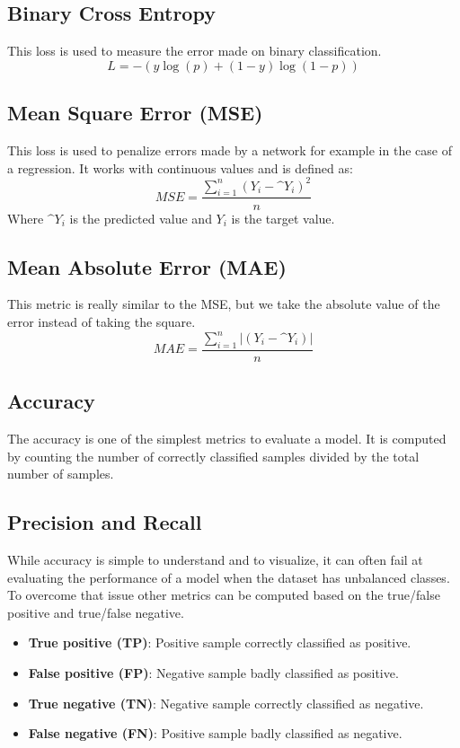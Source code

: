 \subsection{Binary Cross Entropy}
\label{sec:binary_cross_entropy}
This loss is used to measure the error made on binary classification.
$$ L = -(y\log(p) + (1-y)\log(1-p))$$

\subsection{Mean Square Error (MSE)}
\label{sec:mean_square_error}
This loss is used to penalize errors made by a network for example in the case of a regression. It works with continuous values and is defined as:
$$ MSE = \frac{\sum_{i=1}^{n} (Y_i - \^{Y}_i)^2}{n}$$
Where $\^{Y}_i$ is the predicted value and $Y_i$ is the target value.
\subsection{Mean Absolute Error (MAE)}
This metric is really similar to the MSE, but we take the absolute value of the error instead of taking the square.
$$ MAE = \frac{\sum_{i=1}^{n} |(Y_i - \^{Y}_i)|}{n}$$
\subsection{Accuracy}
The accuracy is one of the simplest metrics to evaluate a model. It is computed by counting the number of correctly classified samples divided by the total number of samples.


\subsection{Precision and Recall}
While accuracy is simple to understand and to visualize, it can often fail at evaluating the performance of a model when the dataset has unbalanced classes. To overcome that issue other metrics can be computed based on the true/false positive and true/false negative.

\begin{itemize}
    \item \textbf{True positive (TP)}: Positive sample correctly classified as positive. 
    \item \textbf{False positive (FP)}: Negative sample badly classified as positive. 
    \item \textbf{True negative (TN)}: Negative sample correctly classified as negative. 
    \item \textbf{False negative (FN)}: Positive sample badly classified as negative.
\end{itemize}

